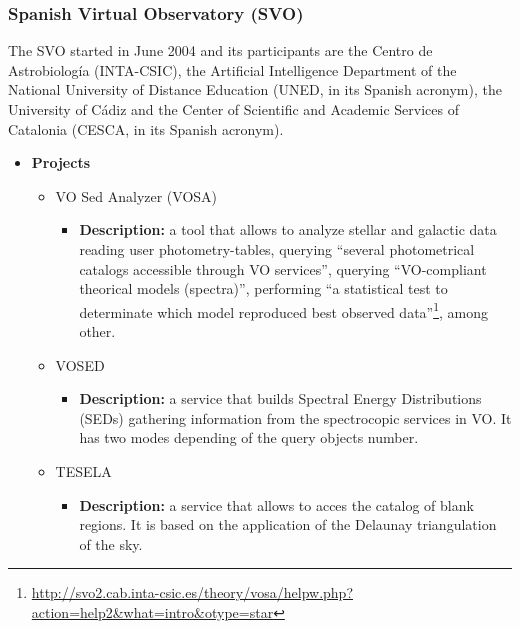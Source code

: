 
\subsubsection{Spanish Virtual Observatory (SVO)}
The SVO \cite{website:svo-home} started in June 2004 and its participants are
the Centro de Astrobiolog\'{i}a (INTA-CSIC), the Artificial Intelligence
Department of the National University of Distance Education (UNED, in its
Spanish acronym), the University of C\'{a}diz and the Center of Scientific and
Academic Services of Catalonia (CESCA, in its Spanish acronym).

\begin{itemize}
\item \textbf{Projects}
\begin{itemize}
\item VO Sed Analyzer (VOSA)
\begin{itemize}
\item \textbf{Description:} a tool that allows to analyze stellar and galactic
data reading user photometry-tables, querying ``several photometrical catalogs
accessible through VO services'', querying ``VO-compliant theorical models
(spectra)'', performing ``a statistical test to determinate which model
reproduced best observed
data''\footnote{\url{http://svo2.cab.inta-csic.es/theory/vosa/helpw.php?action=help2&what=intro&otype=star}},
among other. 
\end{itemize}
\item VOSED
\begin{itemize}
\item \textbf{Description:} a service that builds Spectral Energy Distributions
(SEDs) gathering information from the spectrocopic services in VO. It has two
modes depending of the query objects number.
\end{itemize}
\item TESELA
\begin{itemize}
\item \textbf{Description:} a service that allows to acces the catalog of blank
regions. It is based on the application of the Delaunay triangulation of the
sky.
\end{itemize}
\end{itemize}
\end{itemize}

